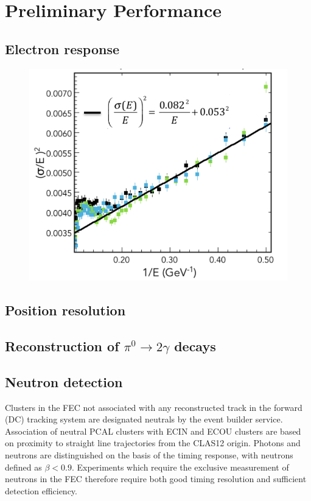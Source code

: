 \section{Preliminary Performance}

\subsection{Electron response}

\begin{figure}[hbt]
\centering
\includegraphics[width=1.0\columnwidth,keepaspectratio]{img/S10_1_3.png}
\caption[]{}
\label{fig:S10_1_2}
\end{figure}

\subsection{Position resolution}
\subsection{Reconstruction of $\pi^0\rightarrow 2\gamma$ decays}
\subsection{Neutron detection}
Clusters in the FEC not associated with any reconstructed track in the forward (DC) tracking system are designated neutrals by the event builder service.  Association of neutral PCAL clusters with ECIN and ECOU clusters are based on proximity to straight line trajectories from the CLAS12 origin.  Photons and neutrons are distinguished on the basis of the timing response, with neutrons defined as $\beta < 0.9$.  Experiments which require the exclusive measurement of neutrons in the FEC therefore require both good timing resolution and sufficient detection efficiency. 


